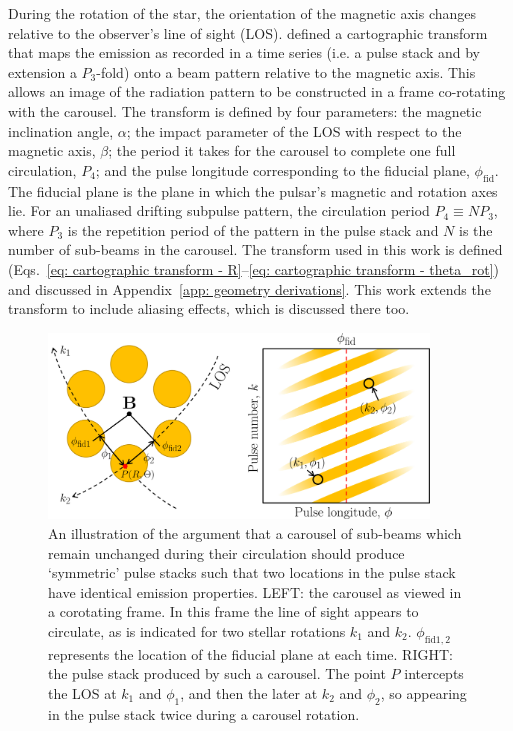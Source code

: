 During the rotation of the star, the orientation of the magnetic axis changes relative to the observer's line of sight (LOS). \citet{DRxx2001} defined a cartographic transform that maps the emission as recorded in a time series (i.e. a pulse stack and by extension a $P_3$-fold) onto a beam pattern relative to the magnetic axis. This allows an image of the radiation pattern to be constructed in a frame co-rotating with the carousel. The transform is defined by four parameters: the magnetic inclination angle, $\alpha$; the impact parameter of the LOS with respect to the magnetic axis, $\beta$; the period it takes for the carousel to complete one full circulation, $P_4$; and the pulse longitude corresponding to the fiducial plane, $\phi_\mathrm{fid}$. The fiducial plane is the plane in which the pulsar's magnetic and rotation axes lie. For an unaliased drifting subpulse pattern, the circulation period $P_4 \equiv NP_3$, where $P_3$ is the repetition period of the pattern in the pulse stack and $N$ is the number of sub-beams in the carousel. The transform used in this work is defined (Eqs.~\eqref{eq: cartographic transform - R}--\eqref{eq: cartographic transform - theta_rot}) and discussed in Appendix~\ref{app: geometry derivations}. This work extends the transform to include aliasing effects, which is discussed there too.

\begin{figure} [t]
	\begin{center}
	\includegraphics[width=0.9\textwidth]{Figures/B0031/opposite_points2}
	\caption[The predicted symmetry in driftbands arising from a circulating carousel]{An illustration of the argument that a carousel of sub-beams which remain unchanged during their circulation should produce `symmetric' pulse stacks such that two locations in the pulse stack have identical emission properties. LEFT: the carousel as viewed in a corotating frame. In this frame the line of sight appears to circulate, as is indicated for two stellar rotations $k_1$ and $k_2$. $\phi_\mathrm{fid 1,2}$ represents the location of the fiducial plane at each time. RIGHT: the pulse stack produced by such a carousel. The point $P$ intercepts the LOS at $k_1$ and $\phi_1$, and then the later at $k_2$ and $\phi_2$, so appearing in the pulse stack twice during a carousel rotation.}
    \label{fig: B0031 - symmetry}
    \end{center}
\end{figure}


